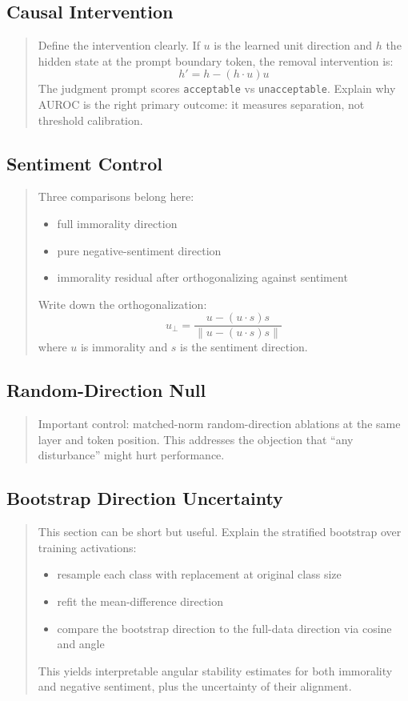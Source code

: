 \documentclass[11pt]{article}
\newcommand{\draftnote}[1]{%
  \begin{quote}\footnotesize\color{gray}#1\end{quote}%
}
\begin{document}
\subsection{Causal Intervention}
\draftnote{
Define the intervention clearly.
If $u$ is the learned unit direction and $h$ the hidden state at the prompt boundary token, the removal intervention is:
\[
h' = h - (h \cdot u)u
\]
The judgment prompt scores \texttt{acceptable} vs \texttt{unacceptable}. Explain why AUROC is the right primary outcome: it measures separation, not threshold calibration.
}

\subsection{Sentiment Control}
\draftnote{
Three comparisons belong here:
\begin{itemize}[leftmargin=1.5em]
    \item full immorality direction
    \item pure negative-sentiment direction
    \item immorality residual after orthogonalizing against sentiment
\end{itemize}
Write down the orthogonalization:
\[
u_{\perp} = \frac{u - (u \cdot s)s}{\|u - (u \cdot s)s\|}
\]
where $u$ is immorality and $s$ is the sentiment direction.
}

\subsection{Random-Direction Null}
\draftnote{
Important control: matched-norm random-direction ablations at the same layer and token position.
This addresses the objection that ``any disturbance'' might hurt performance.
}

\subsection{Bootstrap Direction Uncertainty}
\draftnote{
This section can be short but useful. Explain the stratified bootstrap over training activations:
\begin{itemize}[leftmargin=1.5em]
    \item resample each class with replacement at original class size
    \item refit the mean-difference direction
    \item compare the bootstrap direction to the full-data direction via cosine and angle
\end{itemize}
This yields interpretable angular stability estimates for both immorality and negative sentiment, plus the uncertainty of their alignment.
}
\end{document}
